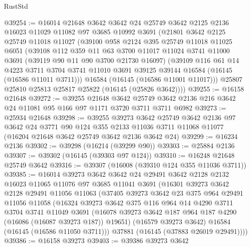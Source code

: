 \begin{lexlean}{RustStd}
\begin{coremodule}
@39254 := @16014
    @21648
    @3642
    @3642
    @24
    @25749
    @3642
    @2125
    @2136
    @16023
    @11029
    @11082
    @97
    @3685
    @10992
    @3691
    (@21801
      @3642
      @2125
      @25749
      @11018
      @11027
      (@39100
        @958
        @2124
        @395
        @25749
        @11018
        @11025
        @6051
        (@39108
          @112
          @359
          @11
          @63
          @3700
          @11017
          @11024
          @3741
          @11000
          @3691
          (@39119 @90 @11 @90 @3700 @21730 @16097)
          (@39109
            @116
            @61
            @14
            @4223
            @3711
            @3704
            @3741
            @11010
            @3691
            @39125
            @39144
            @16584
            (@16145 (@16586 @11011 @3711)))
          @16584
          (@16145 (@16586 @11001 @11017)))
        @25807
        @25810
        @25813
        @25817
        @25822
        (@16145 (@25826 @3642))))
@39255 := @16158 @21648
@39272 := @39255
    @21648
    @3642
    @25749
    @3642
    @2136
    @216
    @3642
    @24
    @11081
    @95
    @166
    @97
    @1171
    @3720
    @3711
    @3711
    @6982
@39273 := @25934 @21648
@39298 := @39255
    @39273
    @3642
    @25749
    @3642
    @2136
    @97
    @3642
    @24
    @3771
    @90
    @124
    @355
    @2133
    @11036
    @3711
    @11068
    @11077
    (@16204 @21648 @3642 @25749 @3642 @2136 @3642 @24)
@39299 := @16234 @2136
@39302 := @39298 (@16214 (@39299 @90))
@39303 := @25884 @2136
@39307 := @39302 (@16145 (@39303 @97 @124))
@39310 := @16248 @21648 @25749 @3642
@39316 := @39307 (@16008 (@39310 @124 @355 @11036 @3711))
@39385 := @16014
    @39273
    @3642
    @3642
    @24
    @29491
    @3642
    @2128
    @2132
    @16023
    @11065
    @11076
    @97
    @3685
    @11041
    @3691
    (@16301
      @39273
      @3642
      @2128
      @29491
      @11056
      @11063
      (@37405
        @39273
        @3642
        @23
        @375
        @964
        @29491
        @11056
        @11058
        (@16324
          @39273
          @3642
          @375
          @116
          @964
          @14
          @4290
          @3711
          @3704
          @3741
          @11049
          @3691
          (@16078 @39273 @3642 @187 @964 @187 @4290 (@16086 (@16087 @39273 @187)) @19651)
          (@16579 @39273 @3642)
          @16584
          (@16145 (@16586 @11050 @3711)))
        @37881
        (@16145 (@37883 @26019 @29491))))
@39386 := @16158 @39273
@39403 := @39386
    @39273
    @3642

\end{coremodule}
\end{lexlean}
